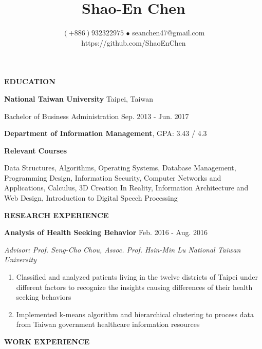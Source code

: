 \documentclass[12pt]{article}
\title{\vspace{-0.8in}Shao-En Chen}
\author{
	$(\texttt{+}886) 932322975$ $\bullet$ seanchen47@gmail.com
	\\https://github.com/ShaoEnChen
}
\date{}
\begin{document}
\maketitle

\textbf{\large{\uppercase{Education}}}
\hrulefill{}

	\vspace{0.5em}

	\textbf{National Taiwan University} \hfill Taipei, Taiwan

	Bachelor of Business Administration \hfill Sep. 2013 - Jun. 2017

	\textbf{Department of Information Management}, GPA: 3.43 / 4.3

	\textbf{Relevant Courses}

	Data Structures, Algorithms, Operating Systems, Database Management, Programming Design, Information Security, Computer Networks and Applications, Calculus, 3D Creation In Reality, Information Architecture and Web Design, Introduction to Digital Speech Processing

	\vspace{1em}

\textbf{\large{\uppercase{Research Experience}}}
\hrulefill{}

	\vspace{0.5em}

	\textbf{Analysis of Health Seeking Behavior} \hfill Feb. 2016 - Aug. 2016

	\textit{Advisor: Prof. Seng-Cho Chou, Assoc. Prof. Hsin-Min Lu \hfill National Taiwan University}

	\begin{enumerate}

		\item Classified and analyzed patients living in the twelve districts of Taipei under different factors to recognize the insights causing differences of their health seeking behaviors

		\item Implemented k-means algorithm and hierarchical clustering to process data from Taiwan government healthcare information resources

	\end{enumerate}

	\vspace{1em}

\textbf{\large{\uppercase{Work Experience}}}
\hrulefill{}

	\vspace{0.5em}
\end{document}
